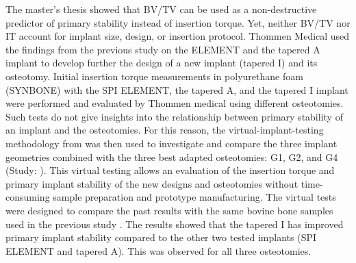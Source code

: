 \documentclass[12pt, a4paper, twoside]{report}
\begin{document}
The master’s thesis showed that BV/TV can be used as a non-destructive predictor of primary stability instead of insertion torque.
Yet, neither BV/TV nor IT account for implant size, design, or insertion protocol.
Thommen Medical used the findings from the previous study \cite{wili_experimental_2021} on the ELEMENT and the tapered A implant to develop further the design of a new implant (tapered I) and its osteotomy.
Initial insertion torque measurements in polyurethane foam (SYNBONE) with the SPI ELEMENT, the tapered A, and the tapered I implant were performed and evaluated by Thommen medical using different osteotomies.
Such tests do not give insights into the relationship between primary stability of an implant and the osteotomies.
For this reason, the virtual-implant-testing methodology from \cite{wili_experimental_2021} was then used to investigate and compare the three implant geometries combined with the three best adapted osteotomies: G1, G2, and G4 (Study: \cite{wili_virtual_2022}).
This virtual testing allows an evaluation of the insertion torque and primary implant stability of the new designs and osteotomies without time-consuming sample preparation and prototype manufacturing.
The virtual tests were designed to compare the past results with the same bovine bone samples used in the previous study \cite{wili_experimental_2021}.
The results showed that the tapered I has improved primary implant stability compared to the other two tested implants (SPI ELEMENT and tapered A).
This was observed for all three osteotomies.
%
%
\end{document}
